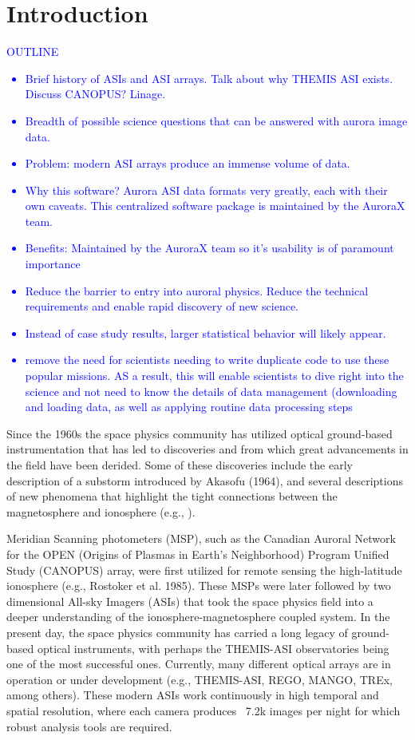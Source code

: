 \documentclass[draft]{agujournal2019}
\begin{document}
\section{Introduction}\label{intro}
\textcolor{blue}{
      OUTLINE
      \begin{itemize}
            \item Brief history of ASIs and ASI arrays. Talk about why THEMIS ASI exists. Discuss CANOPUS? Linage.
            \item Breadth of possible science questions that can be answered with aurora image data.
            \item Problem: modern ASI arrays produce an immense volume of data.
            \item Why this software? Aurora ASI data formats very greatly, each with their own caveats. This centralized software package is maintained by the AuroraX team. 
            \item Benefits: Maintained by the AuroraX team so it's usability is of paramount importance
            \item Reduce the barrier to entry into auroral physics. Reduce the technical requirements and  enable rapid discovery of new science.
            \item Instead of case study results, larger statistical behavior will likely appear.
            \item remove the need for scientists needing to write duplicate code to use these popular missions. AS a result, this will enable scientists to dive right into the science and not need to know the details of data management (downloading and loading data, as well as applying routine data processing steps
      \end{itemize}
}

Since the 1960s the space physics community has utilized optical ground-based instrumentation that has led to discoveries and from which great advancements in the field have been derided.  Some of these discoveries include the early description of a substorm introduced by Akasofu (1964), and several descriptions of new phenomena that highlight the tight connections between the magnetosphere and ionosphere (e.g., ). 

Meridian Scanning photometers (MSP), such as the Canadian Auroral Network for the OPEN (Origins of Plasmas in Earth’s Neighborhood) Program Unified Study (CANOPUS) array, were first utilized for remote sensing the high-latitude ionosphere (e.g., Rostoker et al. 1985). These MSPs were later followed by two dimensional All-sky Imagers (ASIs) that took the space physics field into a deeper understanding of the ionosphere-magnetosphere coupled system. In the present day, the space physics community has carried a long legacy of ground-based optical instruments, with perhaps the THEMIS-ASI observatories being one of the most successful ones. Currently, many different optical arrays are in operation or under development (e.g., THEMIS-ASI, REGO, MANGO, TREx, among others). These modern ASIs work continuously in high temporal and spatial resolution, where each camera produces ~7.2k images per night for which robust analysis tools are required.
\end{document}

